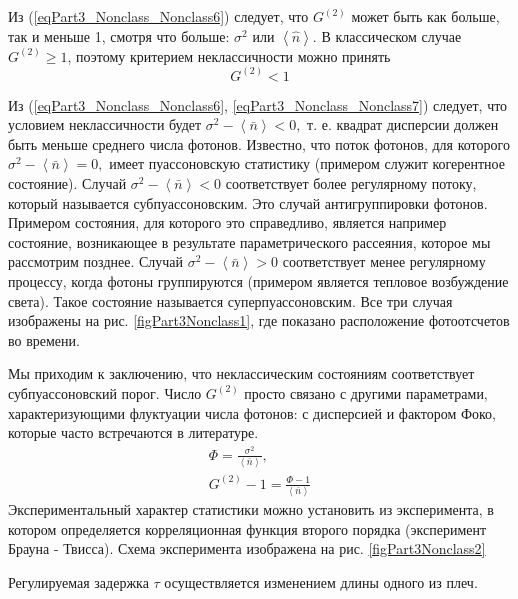 Из (\ref{eqPart3_Nonclass_Nonclass6}) следует, что $G^{(2)}$ может
быть как больше, так и меньше 1, смотря что больше: $\sigma^2$ или
$\left<\hat{n}\right>$. В классическом случае $G^{(2)} \ge 1$, поэтому
критерием неклассичности можно принять 
\begin{equation}
G^{(2)} < 1
\label{eqPart3_Nonclass_Nonclass7}
\end{equation}

Из (\ref{eqPart3_Nonclass_Nonclass6},
\ref{eqPart3_Nonclass_Nonclass7}) следует, что условием неклассичности
будет 
\(
\sigma^2 - \left<\bar{n}\right> < 0,
\) 
т. е. квадрат дисперсии должен быть меньше среднего числа
фотонов. 
Известно, что поток фотонов, для которого
\(
\sigma^2 - \left<\bar{n}\right> = 0,
\)
имеет пуассоновскую статистику (примером служит когерентное
состояние). Случай 
\(
\sigma^2 - \left<\bar{n}\right> < 0
\)
соответствует более регулярному потоку, который называется
субпуассоновским. Это случай антигруппировки фотонов. Примером
состояния, для которого это справедливо, является например состояние,
возникающее в результате параметрического рассеяния, которое мы
рассмотрим позднее. Случай
\(
\sigma^2 - \left<\bar{n}\right> > 0
\)
соответствует менее регулярному процессу, когда фотоны группируются
(примером является тепловое возбуждение света). Такое состояние
называется суперпуассоновским. Все три случая изображены на
рис. \ref{figPart3Nonclass1}, где показано расположение фотоотсчетов
во времени.



Мы приходим к заключению, что неклассическим состояниям соответствует
субпуассоновский порог. Число $G^{(2)}$ просто связано с другими
параметрами, характеризующими флуктуации числа фотонов: с дисперсией и
фактором Фоко, которые часто встречаются в литературе.
\begin{eqnarray}
\Phi  = \frac{\sigma^2}{\left<\bar{n}\right>},
\nonumber \\
G^{(2)} - 1 = \frac{\Phi - 1}{\left<\bar{n}\right>}
\nonumber
\end{eqnarray}
Экспериментальный характер статистики можно установить из эксперимента,
в котором определяется корреляционная функция второго порядка
(эксперимент Брауна - Твисса). Схема эксперимента изображена на
рис. \ref{figPart3Nonclass2} 



Регулируемая задержка $\tau$ осуществляется изменением длины одного из
плеч.

